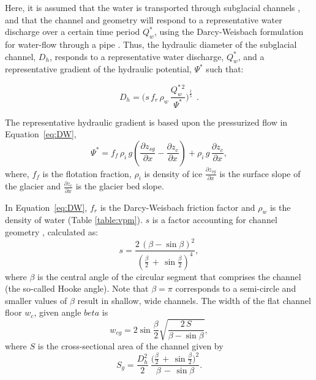 \documentclass[11pt]{article}
\begin{document}
\begin{spacing}{1}
  Here, it is assumed that the water is transported through subglacial channels \citep[Figure~\ref{fig:cartoon}; ][]{rothlisberger1972}, and that the channel  and geometry will respond to a representative water discharge over a certain time period $Q_{w}^*$, using the Darcy-Weisbach formulation for water-flow through a pipe  \citep[e.g.][]{rothlisberger1972,clarke2003,werder2013}.
  Thus, the hydraulic diameter of the subglacial channel, $D_h$, responds to a representative water discharge, $Q_{w}^*$, and a representative gradient of the hydraulic potential, $\Psi^*$ such that:
  \begin{linenomath*}
    \begin{equation}
      \label{eq:DW}
      D_h = \big(s\, f_r\,\rho_w\, \frac{Q_w^{*\,2}}{\Psi^*}\big)^{\frac{1}{5}}~~.
    \end{equation}
  \end{linenomath*}
  The representative hydraulic gradient is based upon the pressurized flow in Equation~\ref{eq:DW},
  \begin{equation}
    \label{eq:psi}
    \Psi^*= f_f \,  \rho_i \, g (\frac{\partial  z_{sg}}{\partial x} - \frac{\partial z_c}{\partial x}) +  \rho_i \, g \, \frac{\partial z_c}{\partial x},
  \end{equation}
  \noindent
  where, $f_f$ is the flotation fraction, $\rho_i$ is density of ice $\frac{\partial z_{sg}}{\partial x}$ is the surface slope of the glacier and $\frac{\partial z_c}{\partial x}$ is the glacier bed slope.
  
  In Equation~\ref{eq:DW}, $f_r$ is the Darcy-Weisbach friction factor and $\rho_w$ is the density of water (Table \ref{table:vpm}). $s$ is a factor accounting for channel geometry \citep{hooke1990}, calculated as:
  \begin{equation}
    \label{eq:Hf}
    s = \frac{2\,(\beta -\sin \beta)^2}{(\frac{\beta}{2}\,+\,\sin \frac{\beta}{2})^4},
  \end{equation}
  where $\beta$ is the central angle of the circular segment that comprises the channel (the so-called Hooke angle). Note that $\beta =\pi$ corresponds to a semi-circle and
  smaller values of $\beta$ result in shallow, wide channels. 
  The width of the flat channel floor $w_c$, given angle $beta$ is 
  \begin{equation}
    \label{eq:dh2wc}
    w_{cg} = 2  \sin \frac{\beta}{2} \sqrt{\frac{2\, S}{\beta -\sin \beta}},
  \end{equation}
  where $S$ is the cross-sectional area of the channel given by
  \begin{equation}
    \label{eq:dh2S}
    S_g =  \frac{D_h^2}{2}~ \frac{\Big(\frac{\beta}{2} \,+ \, \sin \frac{\beta}{2}\Big)^2  }{\beta\,-\,\sin \beta}.
  \end{equation}
  

\end{spacing}
\end{document}
